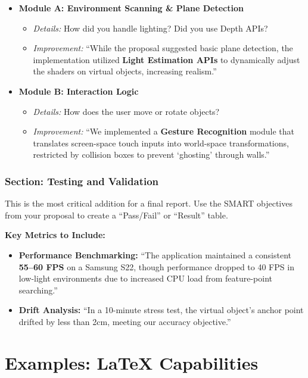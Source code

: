 \documentclass{tietreport}
\begin{document}
\begin{itemize}
\item \textbf{Module A: Environment Scanning \& Plane
    Detection}
  \begin{itemize}
  \item \textit{Details:} How did you handle lighting?
    Did you use Depth APIs?
  \item \textit{Improvement:} ``While the proposal
    suggested basic plane detection, the implementation
    utilized \textbf{Light Estimation APIs} to
    dynamically adjust the shaders on virtual objects,
    increasing realism.''
  \end{itemize}
\item \textbf{Module B: Interaction Logic}
  \begin{itemize}
  \item \textit{Details:} How does the user move or
    rotate objects?
  \item \textit{Improvement:} ``We implemented a
    \textbf{Gesture Recognition} module that translates
    screen-space touch inputs into world-space
    transformations, restricted by collision boxes to
    prevent `ghosting' through walls.''
  \end{itemize}
\end{itemize}

\subsection{Section: Testing and Validation}

This is the most critical addition for a final
report. Use the SMART objectives from your proposal to
create a ``Pass/Fail'' or ``Result'' table.

\textbf{Key Metrics to Include:}

\begin{itemize}
\item \textbf{Performance Benchmarking:} ``The
  application maintained a consistent \textbf{55--60
    FPS} on a Samsung S22, though performance dropped
  to 40 FPS in low-light environments due to increased
  CPU load from feature-point searching.''
\item \textbf{Drift Analysis:} ``In a 10-minute stress
  test, the virtual object's anchor point drifted by
  less than 2cm, meeting our accuracy objective.''
\end{itemize}

\chapter{Examples: \LaTeX{} Capabilities}
\end{document}
